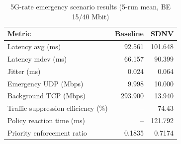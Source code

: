 \begin{table}[t]
\caption{5G-rate emergency scenario results (5-run mean, BE 15/40 Mbit)}
\label{tab:5g-emergency}
\centering
\begin{tabular}{lrr}
\hline
Metric & Baseline & SDNV \\
\hline
Latency avg (ms) & 92.561 & 101.648 \\
Latency mdev (ms) & 66.157 & 90.399 \\
Jitter (ms) & 0.024 & 0.064 \\
Emergency UDP (Mbps) & 9.998 & 10.000 \\
Background TCP (Mbps) & 293.900 & 13.940 \\
Traffic suppression efficiency (\%) & -- & 74.43 \\
Policy reaction time (ms) & -- & 121.792 \\
Priority enforcement ratio & 0.1835 & 0.7174 \\
\hline
\end{tabular}
\end{table}
